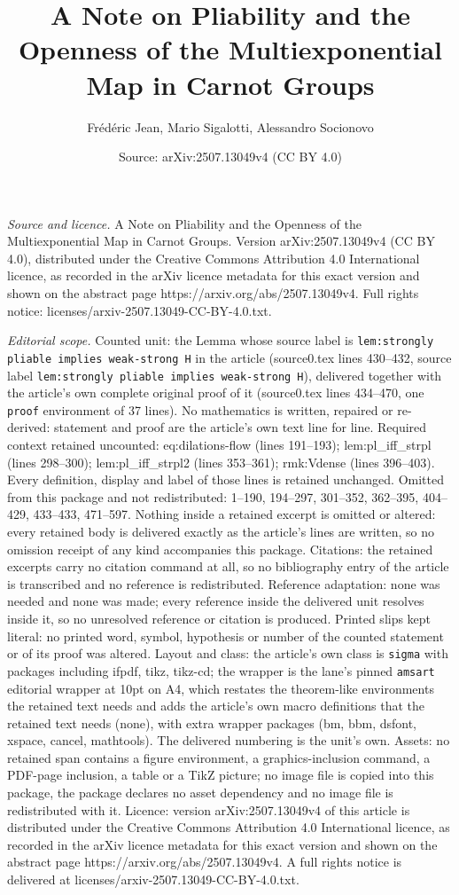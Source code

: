 \documentclass[10pt,a4paper]{amsart}
\title[A Note on Pliability and the Openness of the Multiexponentia]{A Note on Pliability and the Openness of the Multiexponential Map in Carnot Groups}
\author{Fr\'ed\'eric Jean, Mario Sigalotti, Alessandro Socionovo}
\date{Source: arXiv:2507.13049v4 (CC BY 4.0)}
\begin{document}
\maketitle

\noindent\emph{Source and licence.} A Note on Pliability and the Openness of the Multiexponential Map in Carnot Groups. Version arXiv:2507.13049v4 (CC BY 4.0), distributed under the Creative Commons Attribution 4.0 International licence, as recorded in the arXiv licence metadata for this exact version and shown on the abstract page https://arxiv.org/abs/2507.13049v4. Full rights notice: licenses/arxiv-2507.13049-CC-BY-4.0.txt.\par\smallskip

\noindent\textit{Editorial scope.} Counted unit: the Lemma whose source label is \texttt{lem:strongly pliable implies weak-strong H} in the article (source0.tex lines 430--432, source label \texttt{lem:strongly pliable implies weak-strong H}), delivered together with the article's own complete original proof of it (source0.tex lines 434--470, one \texttt{proof} environment of 37 lines). No mathematics is written, repaired or re-derived: statement and proof are the article's own text line for line. Required context retained uncounted: eq:dilations-flow (lines 191--193); lem:pl\_iff\_strpl (lines 298--300); lem:pl\_iff\_strpl2 (lines 353--361); rmk:Vdense (lines 396--403). Every definition, display and label of those lines is retained unchanged. Omitted from this package and not redistributed: 1--190, 194--297, 301--352, 362--395, 404--429, 433--433, 471--597. Nothing inside a retained excerpt is omitted or altered: every retained body is delivered exactly as the article's lines are written, so no omission receipt of any kind accompanies this package. Citations: the retained excerpts carry no citation command at all, so no bibliography entry of the article is transcribed and no reference is redistributed. Reference adaptation: none was needed and none was made; every reference inside the delivered unit resolves inside it, so no unresolved reference or citation is produced. Printed slips kept literal: no printed word, symbol, hypothesis or number of the counted statement or of its proof was altered. Layout and class: the article's own class is \texttt{sigma} with packages including ifpdf, tikz, tikz-cd; the wrapper is the lane's pinned \texttt{amsart} editorial wrapper at 10pt on A4, which restates the theorem-like environments the retained text needs and adds the article's own macro definitions that the retained text needs (none), with extra wrapper packages (bm, bbm, dsfont, xspace, cancel, mathtools). The delivered numbering is the unit's own. Assets: no retained span contains a figure environment, a graphics-inclusion command, a PDF-page inclusion, a table or a TikZ picture; no image file is copied into this package, the package declares no asset dependency and no image file is redistributed with it. Licence: version arXiv:2507.13049v4 of this article is distributed under the Creative Commons Attribution 4.0 International licence, as recorded in the arXiv licence metadata for this exact version and shown on the abstract page https://arxiv.org/abs/2507.13049v4. A full rights notice is delivered at licenses/arxiv-2507.13049-CC-BY-4.0.txt. 
\end{document}

